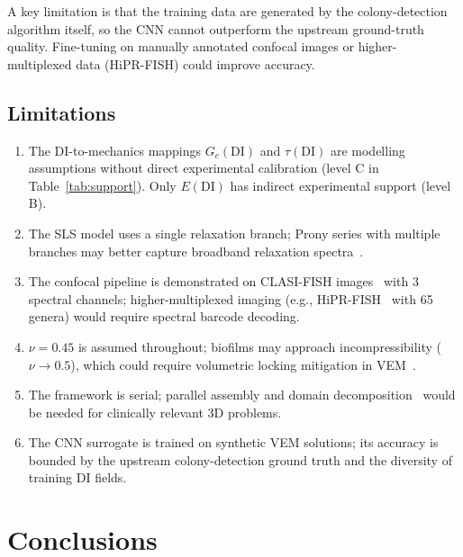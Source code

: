 \documentclass[smallextended]{svjour3}
\newcommand{\DI}{\mathrm{DI}}
\begin{document}
A key limitation is that the training data are generated by the
colony-detection algorithm itself, so the CNN cannot outperform
the upstream ground-truth quality.
Fine-tuning on manually annotated confocal images or
higher-multiplexed data (HiPR-FISH) could improve accuracy.

\subsection{Limitations}

\begin{enumerate}[nosep]
  \item The DI-to-mechanics mappings $G_c(\DI)$ and $\tau(\DI)$ are
    modelling assumptions without direct experimental calibration
    (level C in Table~\ref{tab:support}).
    Only $E(\DI)$ has indirect experimental support (level B).
  \item The SLS model uses a single relaxation branch;
    Prony series with multiple branches may better capture
    broadband relaxation spectra~\cite{Peterson2015}.
  \item The confocal pipeline is demonstrated on CLASI-FISH
    images~\cite{MorilloLopez2022} with 3 spectral channels;
    higher-multiplexed imaging (e.g., HiPR-FISH~\cite{Shi2020}
    with 65 genera) would require spectral barcode decoding.
  \item $\nu = 0.45$ is assumed throughout; biofilms may approach
    incompressibility ($\nu \to 0.5$), which could require
    volumetric locking mitigation in VEM~\cite{Chi2017}.
  \item The framework is serial; parallel assembly and
    domain decomposition~\cite{Antonietti2022} would be needed
    for clinically relevant 3D problems.
  \item The CNN surrogate is trained on synthetic VEM solutions;
    its accuracy is bounded by the upstream colony-detection
    ground truth and the diversity of training DI fields.
\end{enumerate}

\section{Conclusions}
\label{sec:conclusions}
\end{document}
